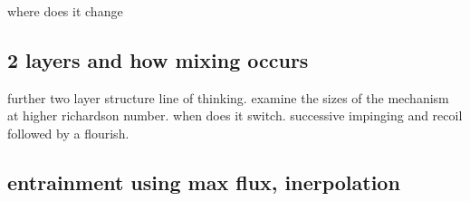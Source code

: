 where does it change
\subsection{2 layers and how mixing occurs}
further two layer structure line of thinking. examine the sizes of the mechanism at higher richardson number. when does it switch.  successive impinging and recoil followed by a flourish.\\

\subsection{entrainment using max flux, inerpolation}
\FloatBarrier


\endinput

Any text after an \endinput is ignored.
You could put scraps here or things in progress.
